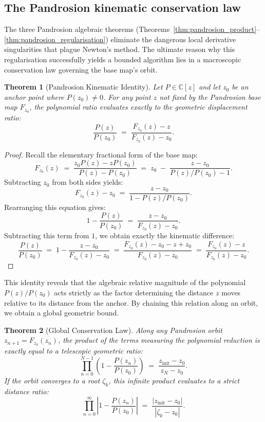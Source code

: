 \documentclass[10pt,a4paper,oneside]{book}
\newtheorem{theorem}{Theorem}[chapter]
\theoremstyle{definition}
\theoremstyle{remark}
\newcommand{\CC}{\mathbb{C}}
\begin{document}
\subsection{The Pandrosion kinematic conservation law}
\label{sec:kinematic_conservation}

The three Pandrosion algebraic theorems (Theorems~\ref{thm:pandrosion_product}--\ref{thm:pandrosion_regularisation}) eliminate the dangerous local derivative singularities that plague Newton's method. The ultimate reason why this regularisation successfully yields a bounded algorithm lies in a macroscopic conservation law governing the base map's orbit.

\begin{theorem}[Pandrosion Kinematic Identity]
\label{thm:kinematic_identity}
Let $P \in \CC[z]$ and let $z_0$ be an anchor point where $P(z_0) \neq 0$. For any point $z$ not fixed by the Pandrosion base map $F_{z_0}$, the polynomial ratio evaluates exactly to the geometric displacement ratio:
\[
  \frac{P(z)}{P(z_0)} \;=\; \frac{F_{z_0}(z) - z}{F_{z_0}(z) - z_0}.
\]
\end{theorem}

\begin{proof}
Recall the elementary fractional form of the base map:
\[
  F_{z_0}(z) \;=\; \frac{z_0 P(z) - z P(z_0)}{P(z) - P(z_0)} \;=\; z_0 \;-\; \frac{z - z_0}{P(z)/P(z_0) - 1}.
\]
Subtracting $z_0$ from both sides yields:
\[
  F_{z_0}(z) - z_0 \;=\; \frac{z - z_0}{1 - P(z)/P(z_0)}.
\]
Rearranging this equation gives:
\[
  1 - \frac{P(z)}{P(z_0)} \;=\; \frac{z - z_0}{F_{z_0}(z) - z_0}.
\]
Subtracting this term from $1$, we obtain exactly the kinematic difference:
\[
  \frac{P(z)}{P(z_0)} \;=\; 1 - \frac{z - z_0}{F_{z_0}(z) - z_0} \;=\; \frac{F_{z_0}(z) - z_0 - z + z_0}{F_{z_0}(z) - z_0} \;=\; \frac{F_{z_0}(z) - z}{F_{z_0}(z) - z_0}.
\]
\end{proof}

This identity reveals that the algebraic relative magnitude of the polynomial $P(z)/P(z_0)$ acts strictly as the factor determining the distance $z$ moves relative to its distance from the anchor. By chaining this relation along an orbit, we obtain a global geometric bound.

\begin{theorem}[Global Conservation Law]
\label{thm:global_conservation}
Along any Pandrosion orbit $z_{n+1} = F_{z_0}(z_n)$, the product of the terms measuring the polynomial reduction is exactly equal to a telescopic geometric ratio:
\[
  \prod_{n=0}^{N-1} \left( 1 - \frac{P(z_n)}{P(z_0)} \right) \;=\; \frac{z_{\mathrm{init}} - z_0}{z_N - z_0}.
\]
If the orbit converges to a root $\zeta_k$, this infinite product evaluates to a strict distance ratio:
\[
  \prod_{n=0}^{\infty} \left| 1 - \frac{P(z_n)}{P(z_0)} \right| \;=\; \frac{|z_{\mathrm{init}} - z_0|}{|\zeta_k - z_0|}.
\]
\end{theorem}
\end{document}
